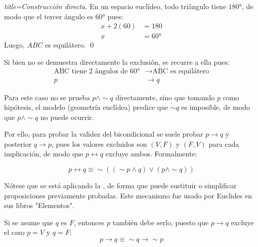 \documentclass{book}
\begin{document}
  \begin{block}
    \item \begin{proof}[title=Construcción directa]
      En un espacio euclídeo, todo triángulo tiene $180°$, de modo que el tercer ángulo es $60°$ pues:
      \begin{align}
        x + 2(60) &= 180 \\
        x &= 60°
      \end{align}
      Luego, $ABC$ es equilátero. \qed
    \end{proof}
    
    \item Si bien no se demuestra directamente la exclusión, se recurre a ella pues:
      \begin{align}
        \text{ABC tiene 2 ángulos de } 60° & \to \text{ABC es equilátero} \\
        p & \to q
      \end{align}
  \end{block}
  
  Para este caso no se prueba $p \land \sim q$ directamente, sino que tomando $p$ como
  hipótesis, el modelo (geometría euclídea) predice que $\sim q$ es imposible, de modo que
  $p \land \sim q$ no puede ocurrir.
  
  Por ello, para probar la validez del bicondicional se suele probar $p \to q$ y posterior
  $q \to p$, pues los valores excluidos son $(V,F)$ y $(F,V)$ para cada implicación, de modo
  que $p \leftrightarrow q$ excluye ambos. Formalmente:
  
  \begin{equation}
  p \leftrightarrow q \equiv \sim((\sim p \land q) \lor (p \land \sim q))
  \end{equation}
  
  Nótese que se está aplicando la
  ,
  de forma que puede sustituir o simplificar proposiciones previamente probadas.
  Este mecanismo fue usado por Euclides en sus libros "Elementos".

  \begin{definition}[title=Contraposición]
  Si se asume que $q$ es $F$, entonces $p$ también debe serlo, puesto que $p \to q$
  excluye el caso $p = V$ y $q = F$:
  \begin{equation}
  p \to q \equiv \sim q \to \sim p
  \end{equation}
  \end{definition}
  
\end{document}
